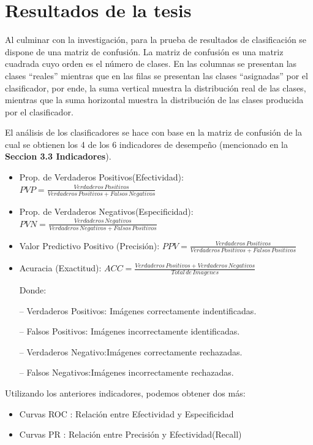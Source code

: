 \chapter{Resultados de la tesis}
\setcounter{page}{95}
\renewcommand{\baselinestretch}{2} %
	
	Al culminar con la investigación, para la prueba de resultados de clasificación se dispone de una matriz de confusión. La matriz de confusión es una matriz cuadrada cuyo orden es el número de clases. En las  columnas se presentan las clases \enquote{reales} mientras que en las filas se presentan las clases \enquote{asignadas} por el clasificador, por ende, la suma vertical muestra la distribución real de las clases, mientras que la suma horizontal muestra la distribución de las clases producida por el clasificador.

	El análisis de los clasificadores se hace con base en la matriz de confusión de la cual se obtienen los 4 de los 6 indicadores de desempeño (mencionado en la \textbf{Seccion 3.3 Indicadores}).

	\begin{itemize}

	\item Prop. de Verdaderos Positivos(Efectividad): {$PVP= \frac{Verdaderos\,Positivos}{{Verdaderos\,Positivos} + {Falsos\,Negativos}}$}
	\item Prop. de Verdaderos Negativos(Especificidad): {$PVN= \frac{Verdaderos\,Negativos}{{Verdaderos\,Negativos} + {Falsos\,Positivos}}$}
	\item Valor Predictivo Positivo (Precisión): {$PPV = \frac{Verdaderos\,Positivos}{{Verdaderos\,Positivos}+{Falsos\,Positivos}}$}
	\item Acuracia (Exactitud): {$ACC= \frac{Verdaderos\,Positivos+Verdaderos\,Negativos}{Total\,de\,Imagenes}$}
	
		Donde:
	
		\item[--] Verdaderos Positivos: Imágenes correctamente indentificadas.
		\item[--] Falsos Positivos: Imágenes incorrectamente identificadas.
		\item[--] Verdaderos Negativo:Imágenes correctamente rechazadas.
		\item[--] Falsos Negativos:Imágenes incorrectamente rechazadas.
	\end{itemize}
	
	Utilizando los anteriores indicadores, podemos obtener dos más:
	\begin{itemize}
		\item Curvas ROC : Relación entre Efectividad y Especificidad
		\item Curvas PR  : Relación entre Precisión y Efectividad(Recall)
	\end{itemize}

